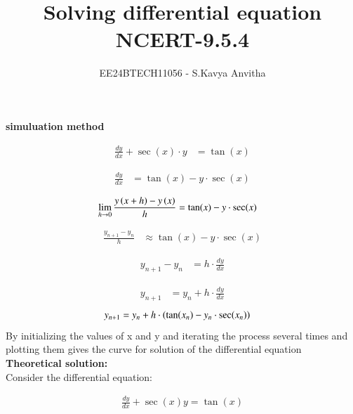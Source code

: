 \documentclass[journal]{IEEEtran}
\begin{document}

\vspace{3cm}

\title{Solving differential equation\\NCERT-9.5.4}
\author{EE24BTECH11056 - S.Kavya Anvitha}
\maketitle
\bigskip

\renewcommand{\thefigure}{\theenumi}
\renewcommand{\thetable}{\theenumi}
\textbf{simuluation method}

\begin{align*}
\frac{dy}{dx} + \sec(x) \cdot y &= \tan(x)
\end{align*}

\begin{align*}
\frac{dy}{dx} &= \tan(x) - y \cdot \sec(x)
\end{align*}

\begin{align*}
\lim_{h \to 0} \frac{y\left(x+h\right) - y\left(x\right)}{h} &= \tan(x) - y \cdot \sec(x)
\end{align*}

\begin{align*}
\frac{y_{n+1} - y_n}{h} &\approx \tan(x) - y \cdot \sec(x)
\end{align*}

\begin{align*}
y_{n+1} - y_n &= h \cdot \frac{dy}{dx}
\end{align*}

\begin{align*}
y_{n+1} &= y_n + h \cdot \frac{dy}{dx}
\end{align*}
\begin{align*}
y_{n+1} &= y_n + h \cdot \left(\tan(x_n) - y_n \cdot \sec(x_n)\right)
\end{align*}
By initializing the values of x and y and iterating the process several times 
and plotting them gives the curve for solution of the differential equation\\

\textbf{Theoretical solution:}\\
Consider the differential equation:

\begin{align*}
\frac{dy}{dx} + \sec(x)y = \tan(x)
\end{align*}
\end{document}
